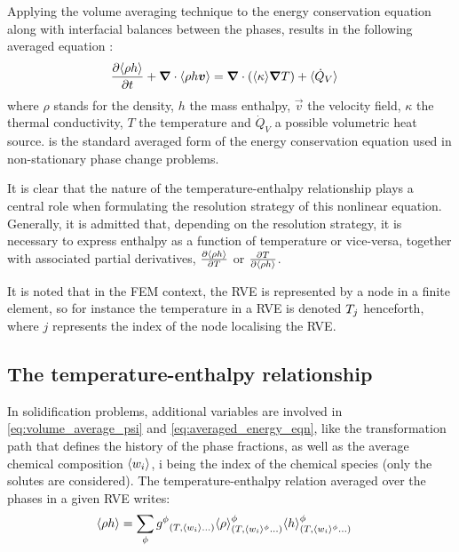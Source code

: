 Applying the volume averaging technique to the energy 
conservation equation along with interfacial balances between the phases, results in the following averaged equation \citep{rappaz_numerical_2003}:
\begin{align}
\label{eq:averaged_energy_eqn}
& \frac{\partial \langle  \rho h  \rangle}{\partial t} + \boldsymbol{\nabla} \cdot \langle  \rho h \boldsymbol{v}  \rangle = \boldsymbol{\nabla} \cdot \left( \langle \kappa \rangle \boldsymbol{\nabla} T \right) + \langle \dot{Q}_V \rangle
\end{align}
where $\rho$ stands for the density, $h$ the mass enthalpy, $\vec{v}$ the velocity field, $\kappa$ the thermal conductivity, $T$ the temperature 
and $\dot{Q}_V$ a possible volumetric heat source. 
 is the standard averaged form of the energy conservation equation used in non-stationary phase 
change problems. 
 
It is clear that the nature of the temperature-enthalpy relationship plays a central 
role when formulating the resolution strategy of this nonlinear equation. Generally, it is admitted that, depending on the resolution strategy, 
it is necessary to express enthalpy as a function of temperature or vice-versa, together with associated partial derivatives, 
$\frac{\partial \langle  \rho h  \rangle}{\partial T}$ or $\frac{\partial T }{\partial \langle  \rho h  \rangle}$.

It is noted that in the FEM context, the RVE is represented by a node in a finite element, so for instance the temperature in a RVE
is denoted $T_j$ henceforth, where $j$ represents the index of the node localising the RVE.

\subsection{The temperature-enthalpy relationship} 

In solidification problems, additional variables are involved in \cref{eq:volume_average_psi} and \cref{eq:averaged_energy_eqn}, 
like the transformation path that defines the history of the phase fractions, as well as the average chemical composition $\langle w_i \rangle$, 
i being the index of the chemical species (only the solutes are considered). The temperature-enthalpy relation averaged over the 
phases in a given RVE writes:
\begin{align}
\label{eq:volume_average_enthalpy}
& \rh = \sum_\phi \gphi_{\brac{T, \wi \dots}} \rphi_{\brac{T, \wi^{\phi} \dots}} \hphi_{\brac{T, \wi^{\phi} \dots}}
\end{align}

